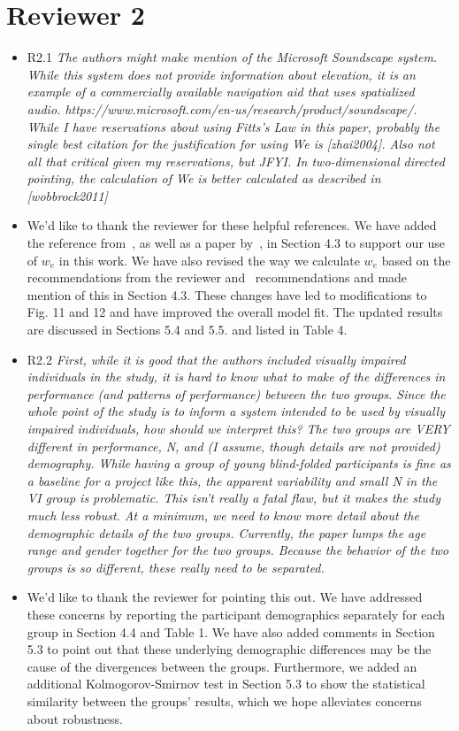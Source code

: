 \documentclass{scrartcl}
\begin{document}
\section*{Reviewer 2}


\begin{itemize}

  \item R2.1 \textit{The authors might make mention of the Microsoft Soundscape system. While this system does not provide information about elevation, it is an example of a commercially available navigation aid that uses spatialized audio. https://www.microsoft.com/en-us/research/product/soundscape/. While I have reservations about using Fitts’s Law in this paper, probably the single best citation for the justification for using We is [zhai2004]. Also not all that critical given my reservations, but JFYI. In two-dimensional directed pointing, the calculation of We is better calculated as described in [wobbrock2011]}
  \item[] We'd like to thank the reviewer for these helpful references. 
    We have added the reference from~\cite{zhai2004speed}, as well as a paper by~\cite{kabbash1995prince}, in Section 4.3 to support our use of $w_e$ in this work.
    We have also revised the way we calculate $w_e$ based on the recommendations from the reviewer and~\cite{wobbrock2011effects} recommendations and made mention of this in Section 4.3. 
    These changes have led to modifications to Fig. 11 and 12 and have improved the overall model fit.
    The updated results are discussed in Sections 5.4 and 5.5. and listed in Table 4.
    
  \item R2.2 \textit{First, while it is good that the authors included visually impaired individuals in the study, it is hard to know what to make of the differences in performance (and patterns of performance) between the two groups. Since the whole point of the study is to inform a system intended to be used by visually impaired individuals, how should we interpret this? The two groups are VERY different in performance, N, and (I assume, though details are not provided) demography. While having a group of young blind-folded participants is fine as a baseline for a project like this, the apparent variability and small N in the VI group is problematic. This isn’t really a fatal flaw, but it makes the study much less robust. At a minimum, we need to know more detail about the demographic details of the two groups. Currently, the paper lumps the age range and gender together for the two groups. Because the behavior of the two groups is so different, these really need to be separated.}
  \item[] We'd like to thank the reviewer for pointing this out. 
    We have addressed these concerns by reporting the participant demographics separately for each group in Section 4.4 and Table 1. 
    We have also added comments in Section 5.3 to point out that these underlying demographic differences may be the cause of the divergences between the groups.  
    Furthermore, we added an additional Kolmogorov-Smirnov test in Section 5.3 to show the statistical similarity between the groups' results, which we hope alleviates concerns about robustness.


\end{itemize}
\end{document}
